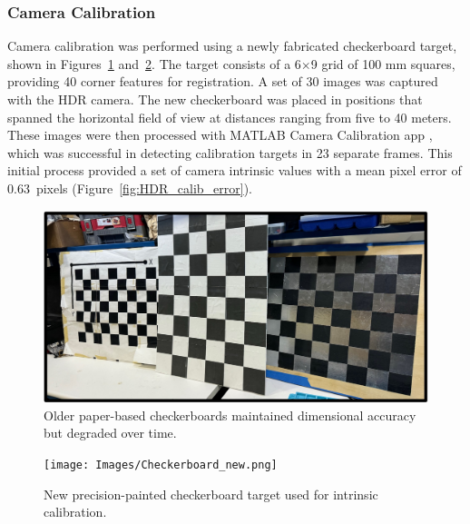 \documentclass{erauthesis}
\begin{document}

\subsubsection{Camera Calibration} \label{sec:camera_intriniscs_results}

Camera calibration was performed using a newly fabricated checkerboard target, shown in Figures~\ref{fig:checkerboard_old} and~\ref{fig:checkerboard_new}.  
The target consists of a 6$\times$9 grid of 100 mm squares, providing 40 corner features for registration.  
A set of 30 images was captured with the HDR camera.
The new checkerboard was placed in positions that spanned the horizontal field of view at distances ranging from five to 40 meters.
These images were then processed with MATLAB Camera Calibration app \cite{matlab_calibration}, which was successful in detecting calibration targets in 23 separate frames.  
This initial process provided a set of camera intrinsic values with a mean pixel error of 0.63~pixels (Figure~\ref{fig:HDR_calib_error}).

\begin{figure}[htbp]
    \centering
    \includegraphics[width=0.9\linewidth]{Images/checkerboard_old.jpg}
    \caption{Older paper-based checkerboards maintained dimensional accuracy but degraded over time.}
    \label{fig:checkerboard_old}
\end{figure}

\begin{figure}[htbp]
    \centering
    \texttt{[image: Images/Checkerboard\_new.png]}
    \caption{New precision-painted checkerboard target used for intrinsic calibration.}
    \label{fig:checkerboard_new}
\end{figure}
\end{document}
